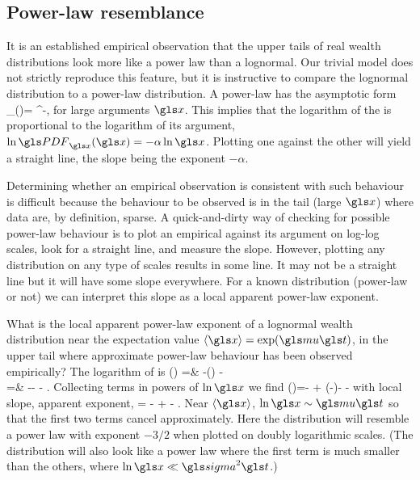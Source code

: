 \subsection{Power-law resemblance}
It is an established empirical observation \cite{Newman2005} that the upper tails of 
real wealth distributions look more like a power law than a lognormal. Our trivial model does not
strictly reproduce this feature, but it is instructive to compare the lognormal distribution
to a power-law distribution. A power-law \PDFa has the asymptotic form 
\be
\PDF_\x(\x)= \x^{-\alpha},
\ee
for large arguments $\x$. This implies that the logarithm of the \PDFa is proportional 
to the logarithm of its argument, $\ln \PDF_\x(\x) = -\alpha \ln \x$. Plotting
one against the other will yield a straight line, the slope being the exponent $-\alpha$. 

Determining whether an empirical observation is consistent with such behaviour 
is difficult because the behaviour to be observed is in the tail (large $\x$) where data are,
by definition, sparse. A quick-and-dirty way of checking for possible power-law 
behaviour is to plot an empirical \PDFa against its argument on log-log scales, 
look for a straight line, and measure the slope. However, plotting any distribution on any 
type of scales results in some line. It may not be a straight line but it will have some slope 
everywhere. For a known distribution (power-law or not) we can interpret this slope 
as a local apparent power-law exponent. 

What is the local apparent power-law exponent of a lognormal wealth distribution near the 
expectation value $\ave{\x}=\exp(\gmu \t)$, \ie in the upper tail where approximate power-law behaviour
has been observed empirically? The logarithm of  is
\bea
\ln \PDF(\x) =& -\ln\left(\x{}\right) -\\
=& -\ln \x - - .
\eea
Collecting terms in powers of $\ln \x$ we find
\be
\ln \PDF(\x)=-  + \left(-\right)\ln \x - -
\ee
with local slope, \ie apparent exponent,
\be
\frac{\gd\ln \PDF(\x)}{\gd \ln \x} = - \frac{\ln \x}{\gsigma^2 \t}  +  - .
\ee
Near $\ave{\x}$, $\ln \x \sim \gmu \t$ so that the first two terms cancel approximately. Here the distribution will resemble a power law with exponent $-3/2$ when plotted on doubly logarithmic scales. (The distribution will also look like a power law where the first term is much smaller than the others, \eg where $\ln \x \ll \gsigma^2 \t$.) 

